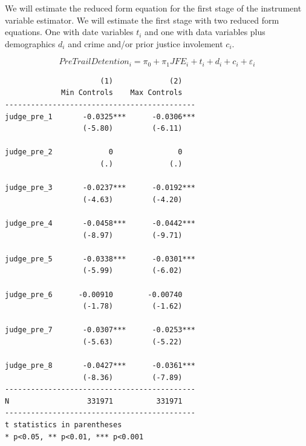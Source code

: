 \documentclass[
]{book}
\newenvironment{Shaded}{\begin{snugshade}}{\end{snugshade}}
\newcommand{\KeywordTok}[1]{\textcolor[rgb]{0.13,0.29,0.53}{\textbf{#1}}}
\newcommand{\NormalTok}[1]{#1}
\newcommand{\OtherTok}[1]{\textcolor[rgb]{0.56,0.35,0.01}{#1}}
\newcommand{\StringTok}[1]{\textcolor[rgb]{0.31,0.60,0.02}{#1}}
\begin{document}
We will estimate the reduced form equation for the first stage of the instrument variable estimator. We will estimate the first stage with two reduced form equations. One with date variables \(t_i\) and one with data variables plus demographics \(d_i\) and crime and/or prior justice involement \(c_i\).

\[ PreTrailDetention_i = \pi_0 + \pi_1 JFE_i + t_i + d_i+c_i + \varepsilon_i \]

\begin{Shaded}
\end{Shaded}

\begin{verbatim}
                      (1)             (2)   
             Min Controls    Max Controls   
--------------------------------------------
judge_pre_1       -0.0325***      -0.0306***
                  (-5.80)         (-6.11)   

judge_pre_2             0               0   
                      (.)             (.)   

judge_pre_3       -0.0237***      -0.0192***
                  (-4.63)         (-4.20)   

judge_pre_4       -0.0458***      -0.0442***
                  (-8.97)         (-9.71)   

judge_pre_5       -0.0338***      -0.0301***
                  (-5.99)         (-6.02)   

judge_pre_6      -0.00910        -0.00740   
                  (-1.78)         (-1.62)   

judge_pre_7       -0.0307***      -0.0253***
                  (-5.63)         (-5.22)   

judge_pre_8       -0.0427***      -0.0361***
                  (-8.36)         (-7.89)   
--------------------------------------------
N                  331971          331971   
--------------------------------------------
t statistics in parentheses
* p<0.05, ** p<0.01, *** p<0.001
\end{verbatim}
\end{document}
